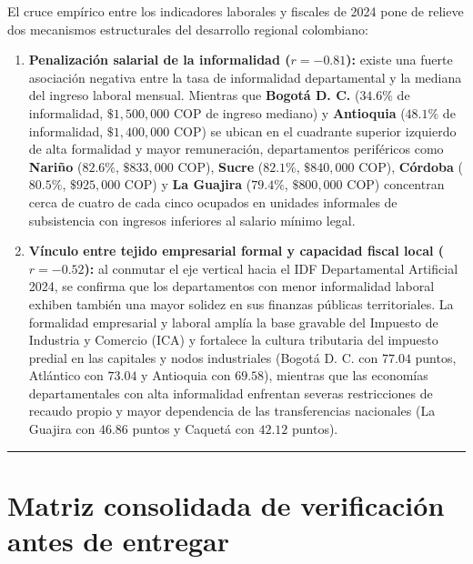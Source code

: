 \documentclass[
  10pt,
  letterpaper,
  DIV=11,
  numbers=noendperiod]{scrartcl}
\providecommand{\tightlist}{%
  \setlength{\itemsep}{0pt}\setlength{\parskip}{0pt}}
\begin{document}
El cruce empírico entre los indicadores laborales y fiscales de 2024
pone de relieve dos mecanismos estructurales del desarrollo regional
colombiano:

\begin{enumerate}
\def\labelenumi{\arabic{enumi}.}
\tightlist
\item
  \textbf{Penalización salarial de la informalidad (\(r = -0.81\)):}
  existe una fuerte asociación negativa entre la tasa de informalidad
  departamental y la mediana del ingreso laboral mensual. Mientras que
  \textbf{Bogotá D. C.} (\(34.6\%\) de informalidad, \(\$1,500,000\) COP
  de ingreso mediano) y \textbf{Antioquia} (\(48.1\%\) de informalidad,
  \(\$1,400,000\) COP) se ubican en el cuadrante superior izquierdo de
  alta formalidad y mayor remuneración, departamentos periféricos como
  \textbf{Nariño} (\(82.6\%\), \(\$833,000\) COP), \textbf{Sucre}
  (\(82.1\%\), \(\$840,000\) COP), \textbf{Córdoba} (\(80.5\%\),
  \(\$925,000\) COP) y \textbf{La Guajira} (\(79.4\%\), \(\$800,000\)
  COP) concentran cerca de cuatro de cada cinco ocupados en unidades
  informales de subsistencia con ingresos inferiores al salario mínimo
  legal.
\item
  \textbf{Vínculo entre tejido empresarial formal y capacidad fiscal
  local (\(r = -0.52\)):} al conmutar el eje vertical hacia el IDF
  Departamental Artificial 2024, se confirma que los departamentos con
  menor informalidad laboral exhiben también una mayor solidez en sus
  finanzas públicas territoriales. La formalidad empresarial y laboral
  amplía la base gravable del Impuesto de Industria y Comercio (ICA) y
  fortalece la cultura tributaria del impuesto predial en las capitales
  y nodos industriales (Bogotá D. C. con \(77.04\) puntos, Atlántico con
  \(73.04\) y Antioquia con \(69.58\)), mientras que las economías
  departamentales con alta informalidad enfrentan severas restricciones
  de recaudo propio y mayor dependencia de las transferencias nacionales
  (La Guajira con \(46.86\) puntos y Caquetá con \(42.12\) puntos).
\end{enumerate}

\begin{center}\rule{0.5\linewidth}{0.5pt}\end{center}

\section{Matriz consolidada de verificación antes de
entregar}\label{matriz-consolidada-de-verificaciuxf3n-antes-de-entregar}
\end{document}
